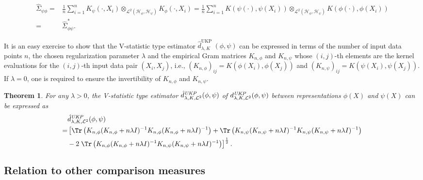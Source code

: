 \documentclass{article} %
\newcommand{\HS}{\mathcal{L}^{2}}
\newcommand{\repone}{\phi}
\newcommand{\reptwo}{\psi}
\newcommand{\Hone}{\mathcal{H}_{\phi}}
\newcommand{\Htwo}{\mathcal{H}_{\psi}}
\newcommand{\metricstname}{UKP }
\newcommand{\dtwo}{d_{\lambda,K,\mathcal{L}^{2}}^{\emph{\metricstname}}}
\newcommand{\dtwohat}{\hat{d}_{\lambda,K,\mathcal{L}^{2}}^{\emph{\metricstname}}}
\theoremstyle{plain}
\newcounter{theoremno}
\newtheorem{theorem}[theoremno]{Theorem}
\begin{document}
\[\begin{aligned}
    \hat{\Sigma}_{\reptwo\repone} =&\frac{1}{n}\sum_{i=1}^{n} K_{\reptwo}(\cdot,X_{i}) \otimes_{\HS(\Hone,\Htwo)}  K_{\repone}(\cdot,X_{i})
    =\frac{1}{n}\sum_{i=1}^{n}K(\reptwo(\cdot),\reptwo(X_{i}))\otimes_{\HS(\Hone,\Htwo)}  K(\repone(\cdot),\repone(X_{i}))\\
    =& \hat{\Sigma}_{\repone\reptwo}^{*}.
\end{aligned}\]

It is an easy exercise to show that the V-statistic type estimator $\hat{d}_{\lambda,K}^{\text{\metricstname}}(\repone,\reptwo)$ can be expressed in terms of the number of input data points $n$, the chosen regularization parameter $\lambda$ and the empirical Gram matrices $K_{n,\repone}$ and $K_{n,\reptwo}$ whose $(i,j)$-th elements are the kernel evaluations for the $(i,j)$-th input data pair $(X_{i},X_{j})$, i.e., $\left(K_{n,\repone}\right)_{ij} = K(\repone(X_{i}),\repone(X_{j}))$ and $\left(K_{n,\reptwo}\right)_{ij} = K(\reptwo(X_{i}),\reptwo(X_{j}))$. If $\lambda=0$, one is required to ensure the invertibility of $K_{n,\repone}$ and $K_{n,\reptwo}$.

\begin{theorem}\label{Proposition: Estimator in terms of Gram matrices}
    For any $\lambda>0$, the V-statistic type estimator $\dtwohat(\repone,\reptwo)$ of $\dtwo(\repone,\reptwo)$ between representations $\repone(X)$ and $\reptwo(X)$ can be expressed as
    \[
    \begin{aligned}
        &\dtwohat(\repone,\reptwo)\\
        =& \left[\Tr\left(K_{n,\repone}(K_{n,\repone}+n\lambda I)^{-1}K_{n,\repone}(K_{n,\repone}+n\lambda I)^{-1}\right) + \Tr\left(K_{n,\reptwo}(K_{n,\reptwo}+n\lambda I)^{-1}K_{n,\reptwo}(K_{n,\reptwo}+n\lambda I)^{-1}\right)\right.\\
        &-2\left.\Tr\left(K_{n,\repone}(K_{n,\repone}+n\lambda I)^{-1}K_{n,\reptwo}(K_{n,\reptwo}+n\lambda I)^{-1}\right)\right]^{\frac{1}{2}}.
    \end{aligned}
    \]
\end{theorem}

\subsection{Relation to other comparison measures} 
\label{Relation to other comparison measures}
\end{document}
